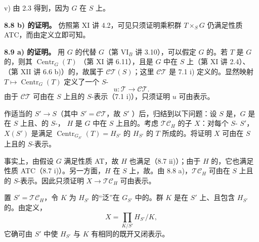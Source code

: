 v) 由 2.3 得到，因为 $G$ 在 $S$ 上。

\textbf{8.8 b) 的证明。} 仿照第 XI 讲 4.2，可见只须证明乘积群 $T\times_S G$ 仍满足性质 ATC，而由定义立即可知。

\textbf{8.9 a) 的证明。} 用 $G$ 的代替 $G$（第 VI$_B$ 讲 3.10），可以假定 $G$ 的。若 $T$ 是 $G$ 的，则其 $\operatorname{Centr}_G(T)$ （第 XI 讲 6.11），且是 $G$ 中在 $S$ 上（第 XI 讲 2.4）、（第 XII 讲 6.6 b)）的，故属于 $\mathcal{CT}(S)$；这里 $\mathcal{CT}$ 是 7.1 i) 定义的。显然映射 $T\mapsto\operatorname{Centr}_G(T)$ 定义了一个 $S$-
\[u:\mathcal T\longrightarrow\mathcal{CT}.\]
由于 $\mathcal{CT}$ 可由在 $S$ 上且的 $S$-表示（7.1 i)），只须证明 $u$ 可由表示。

作适当的 $S'\to S$（其中 $S'=\mathcal{CT}$，故 $S'$ ）后，归结到以下问题：设 $S$ 是，$G$ 是在 $S$ 上且、的 $S$-，
$H$ 是 $G$ 中在 $S$ 上且的。考虑 $\mathcal{TC}_H$ 的子 $X$：对每个 $S$- $S'$，$X(S')$ 是满足 $\operatorname{Centr}_{G_{S'}}(T)=H_{S'}$ 的 $H_{S'}$ 的 $T$ 所成的。将证明 $X$ 可由在 $S$ 上且的 $S$-表示。

事实上，由假设 $G$ 满足性质 AT，故 $H$ 也满足（8.7 ii)）；由于 $H$ 的，它也满足性质 ATC（8.7 i)）。另一方面，$H$ 在 $S$ 上，故。由 8.8 a)，$\mathcal{TC}_H$ 可由在 $S$ 上且的 $S$-表示。因此只须证明 $X\to\mathcal{TC}_H$ 可由表示。

置 $S'=\mathcal{TC}_H$，令 $K$ 为 $H_{S'}$ 的“泛”在 $G_{S'}$ 中的。群 $K$ 是在 $S'$ 上、且包含 $H_{S'}$ 的。由定义，
\[X=\prod_{K/S'}H_{S'}/K,\]
它确可由 $S'$ 中使 $H_{S'}$ 与 $K$ 有相同的既开又闭表示。

